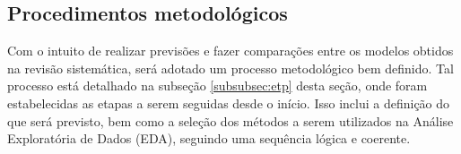 \subsection{Procedimentos metodol{\'o}gicos} \label{subsec:metod}

Com o intuito de realizar previsões e fazer comparações entre os modelos obtidos na revisão sistemática, será adotado um processo metodológico bem definido. Tal processo está detalhado na subseção \ref{subsubsec:etp} desta seção, onde foram estabelecidas as etapas a serem seguidas desde o início. Isso inclui a definição do que será previsto, bem como a seleção dos métodos a serem utilizados na Análise Exploratória de Dados (EDA), seguindo uma sequência lógica e coerente.
   
%
%    
%    	
%    	
%    	
%        	
%    	
